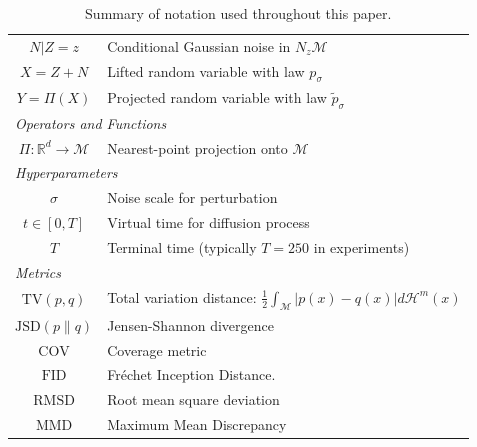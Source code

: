 \begin{table}[H]
\begin{tabular}{cl}
$N | Z=z$ & Conditional Gaussian noise in $N_z\mathcal{M}$ \\
$X = Z + N$ & Lifted random variable with law $p_\sigma$ \\
$Y = \Pi(X)$ & Projected random variable with law $\tilde{p}_\sigma$ \\
\midrule
\multicolumn{2}{l}{\textit{Operators and Functions}} \\
$\Pi: \mathbb{R}^d \to \mathcal{M}$ & Nearest-point projection onto $\mathcal{M}$ \\
\midrule
\multicolumn{2}{l}{\textit{Hyperparameters}} \\
$\sigma$ & Noise scale for perturbation \\
$t \in [0, T]$ & Virtual time for diffusion process \\
$T$ & Terminal time (typically $T=250$ in experiments) \\
\midrule
\multicolumn{2}{l}{\textit{Metrics}} \\
$\text{TV}(p, q)$ & Total variation distance: $\frac{1}{2}\int_{\mathcal{M}} |p(x) - q(x)| d\mathcal{H}^m(x)$ \\
$\text{JSD}(p \| q)$ & Jensen-Shannon divergence \\
$\text{COV}$ & Coverage metric \\
$\text{FID}$ & Fr\'echet Inception Distance. \\
$\text{RMSD}$ & Root mean square deviation \\
$\text{MMD}$ & Maximum Mean Discrepancy \\
\bottomrule
\end{tabular}
\caption{Summary of notation used throughout this paper.}
\end{table}
